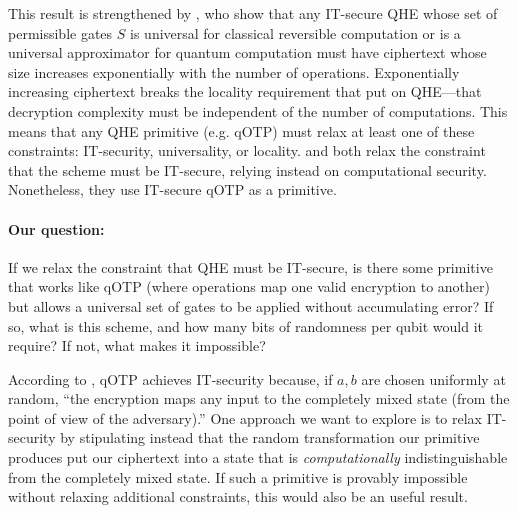 \documentclass{article}
\begin{document}
This result is strengthened by \citet{yu2014}, who show that any IT-secure QHE
whose set of permissible gates $S$ is universal for classical reversible
computation or is a universal approximator for quantum computation must have
ciphertext whose size increases exponentially with the number of operations.
Exponentially increasing ciphertext breaks the locality requirement that
\citet{broadbent2015} put on QHE---that decryption complexity must be
independent of the number of computations. This means that any QHE primitive
(e.g. qOTP) must relax at least one of these constraints: IT-security,
universality, or locality. \citet{broadbent2015} and \citet{dulek2016} both
relax the constraint that the scheme must be IT-secure, relying instead on
computational security. Nonetheless, they use IT-secure qOTP as a primitive.

\paragraph{Our question:} If we relax the constraint that QHE must be IT-secure,
is there some primitive that works like qOTP (where operations map one valid
encryption to another) but allows a universal set of gates to be applied without
accumulating error? If so, what is this scheme, and how many bits of randomness
per qubit would it require? If not, what makes it impossible?

According to \citet{broadbent2015}, qOTP achieves IT-security because, if $a,b$
are chosen uniformly at random, ``the encryption maps any input to the completely
mixed state (from the point of view of the adversary).'' One approach we want to
explore is to relax IT-security by stipulating instead that the random
transformation our primitive produces put our ciphertext into a state that is
\textit{computationally} indistinguishable from the completely mixed state. If
such a primitive is provably impossible without relaxing additional constraints,
this would also be an useful result.



\end{document}

